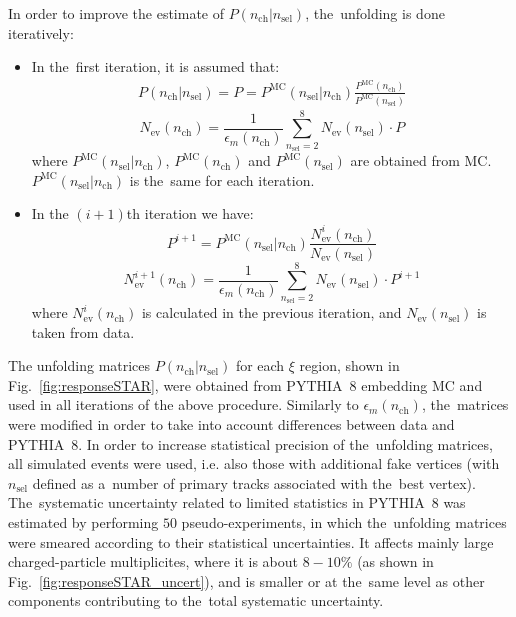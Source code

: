 \noindent 
In order to improve the estimate of $P(n_\textrm{ch}|n_\textrm{sel})$, the~unfolding  is done iteratively:
\begin{itemize}
	\item In the~first iteration, it is assumed that: \\
	\begin{eqnarray}
	P(n_\textrm{ch}|n_\textrm{sel}) = P = P^{\textrm{MC}}(n_\textrm{sel}|n_\textrm{ch})\frac{P^\textrm{MC}(n_\textrm{ch})}{P^\textrm{MC}(n_\textrm{sel})}
	\end{eqnarray}
	\begin{equation}
	N_\textrm{ev}(n_\textrm{ch})=\frac{1}{\epsilon_{m}(n_\textrm{ch})}\sum_{n_\textrm{sel}=2}^{8}N_\textrm{ev}(n_\textrm{sel})\cdot P
	\end{equation}
	where $P^{\textrm{MC}}(n_\textrm{sel}|n_\textrm{ch})$, $P^\textrm{MC}(n_\textrm{ch})$ and $P^\textrm{MC}(n_\textrm{sel})$ are obtained from MC. $P^{\textrm{MC}}(n_\textrm{sel}|n_\textrm{ch})$ is the~same for each iteration.
	
	\item In the $(i+1)$th iteration we have:
	\begin{equation}
	P^{i+1}=P^{\textrm{MC}}(n_\textrm{sel}|n_\textrm{ch})\frac{N_\textrm{ev}^{i}(n_\textrm{ch})}{N_\textrm{ev}(n_\textrm{sel})}
	\end{equation}
	\begin{equation}
	N_\textrm{ev}^{i+1}(n_\textrm{ch})=\frac{1}{\epsilon_{m}(n_\textrm{ch})}\sum_{n_\textrm{sel}=2}^{8}N_\textrm{ev}(n_\textrm{sel})\cdot P^{i+1}
	\end{equation}
	where  $N_\textrm{ev}^i(n_\textrm{ch})$ is calculated in the previous iteration, and $N_\textrm{ev}(n_\textrm{sel})$ is taken from data.
\end{itemize}

The  unfolding matrices $P(n_\textrm{ch}|n_\textrm{sel})$  for each $\xi$ region, shown in Fig.~\ref{fig:responseSTAR}, were obtained from PYTHIA~8 embedding MC and used in all iterations of the above procedure. Similarly to $\epsilon_m(n_\textrm{ch})$, the~matrices were modified in order to take into account differences between data and PYTHIA~8. In order to  increase statistical precision of the~unfolding matrices,   all simulated events were used, i.e. also those with additional fake vertices (with $n_\textrm{sel}$ defined as a~number of primary tracks associated with the~best vertex).
The~systematic uncertainty related to limited statistics in PYTHIA~8 was estimated by performing $50$ pseudo-experiments, in which the~unfolding matrices were smeared according to their statistical uncertainties.
It affects mainly large charged-particle multiplicites, where it is about $8-10\%$ (as shown in Fig.~\ref{fig:responseSTAR_uncert}), and is smaller or at the~same level as  other components contributing  to the~total systematic uncertainty.


